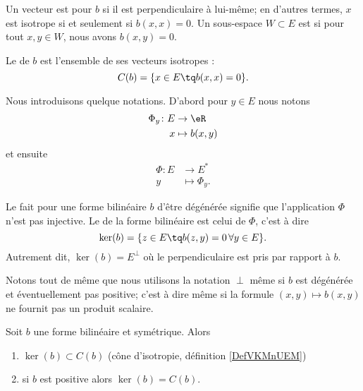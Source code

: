 \begin{definition}[Isotropie]   \label{DefVKMnUEM}
    Un vecteur est  pour \( b\) si il est perpendiculaire à lui-même; en d'autres termes, \( x\) est isotrope si et seulement si \( b(x,x)=0\). Un sous-espace \( W\subset E\) est  si pour tout \( x,y\in W\), nous avons \( b(x,y)=0\).

    Le  de \( b\) est l'ensemble de ses vecteurs isotropes :
    \begin{equation}
        C(b)=\{ x\in E\tq b(x,x)=0 \}.
    \end{equation}
\end{definition}
Nous introduisons quelque notations. D'abord pour \( y\in E\) nous notons
\begin{equation}
    \begin{aligned}
        \Phi_y\colon E&\to \eR \\
        x&\mapsto b(x,y) 
    \end{aligned}
\end{equation}
et ensuite
\begin{equation}
    \begin{aligned}
        \Phi\colon E&\to E^* \\
        y&\mapsto \Phi_y. 
    \end{aligned}
\end{equation}
\begin{definition}
    Le fait pour une forme bilinéaire \( b\) d'être dégénérée signifie que l'application \( \Phi\) n'est pas injective. Le  de la forme bilinéaire est celui de \( \Phi\), c'est à dire
    \begin{equation}
        \ker(b)=\{ z\in E\tq b(z,y)=0\,\forall y\in E \}.
    \end{equation}
    Autrement dit, \( \ker(b)=E^{\perp}\) où le perpendiculaire est pris par rapport à \( b\).
\end{definition}
Notons tout de même que nous utilisons la notation \( \perp\) même si \( b\) est dégénérée et éventuellement pas positive; c'est à dire même si la formule \( (x,y)\mapsto b(x,y)\) ne fournit pas un produit scalaire.

\begin{proposition}     \label{PropHIWjdMX}
    Soit \( b\) une forme bilinéaire et symétrique. Alors
    \begin{enumerate}
        \item
            \( \ker(b)\subset C(b)\) (cône d'isotropie, définition \ref{DefVKMnUEM})
        \item
            si \( b\) est positive alors \( \ker(b)=C(b)\).
    \end{enumerate}
\end{proposition}

